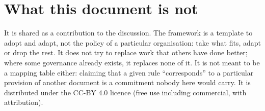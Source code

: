 \section*{What this document is not}

It is shared as a contribution to the discussion.
The framework is a template to adopt and adapt, not the policy of a particular organisation: take what fits, adapt or drop the rest.
It does not try to replace work that others have done better; where some governance already exists, it replaces none of it.
It is not meant to be a mapping table either: claiming that a given rule \enquote{corresponds} to a particular provision of another document is a commitment nobody here would carry.
It is distributed under the CC-BY 4.0 licence (free use including commercial, with attribution).


